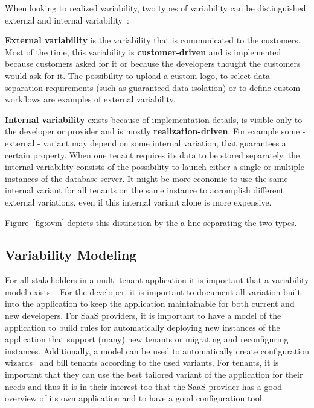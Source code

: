 When looking to realized variability, two types of variability can be distinguished: external and internal variability~\cite{mietzner2009variability}:
\begin{compactitem}
\item \textbf{External variability} is the variability that is communicated to the customers. Most of the time, this variability is \textbf{customer-driven} and is implemented because customers asked for it or because the developers thought the customers would ask for it. The possibility to upload a custom logo, to select data-separation requirements (such as guaranteed data isolation) or to define custom workflows are examples of external variability.
\item \textbf{Internal variability} exists because of implementation details, is visible only to the developer or provider and is mostly \textbf{realization-driven}. For example some - external - variant may depend on some internal variation, that guarantees a certain property. When one tenant requires its data to be stored separately, the internal variability consists of the possibility to launch either a single or multiple instances of the database server. It might be more economic to use the same internal variant for all tenants on the same instance to accomplish different external variations, even if this internal variant alone is more expensive.
\end{compactitem}
Figure~\ref{fig:ovm} depicts this distinction by the a line separating the two types.

\subsection{Variability Modeling}
For all stakeholders in a multi-tenant application it is important that a variability model exists~\cite{schroeter2012towards}. For the developer, it is important to document all variation built into the application to keep the application maintainable for both current and new developers. 
For SaaS providers, it is important to have a model of the application to build rules for automatically deploying new instances of the application that support (many) new tenants or migrating and reconfiguring instances. 
Additionally, a model can be used to automatically create configuration wizards~\cite{mietzner2008generation} and bill tenants according to the used variants.
For tenants, it is important that they can use the best tailored variant of the application for their needs and thus it is in their interest too that the SaaS provider has a good overview of its own application and to have a good configuration tool.

